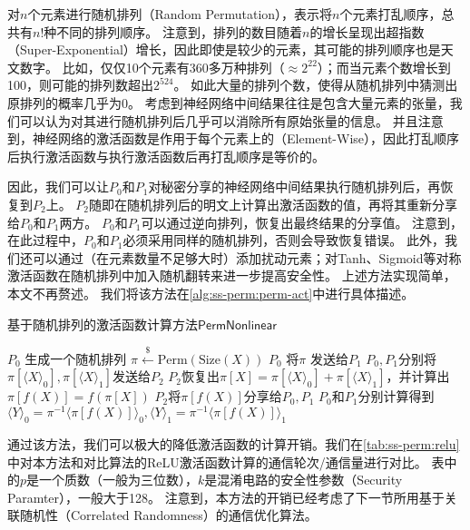 对$n$个元素进行随机排列（Random Permutation），表示将$n$个元素打乱顺序，总共有$n!$种不同的排列顺序。
%
注意到，排列的数目随着$n$的增长呈现出超指数（Super-Exponential）增长，因此即使是较少的元素，其可能的排列顺序也是天文数字。
%
比如，仅仅10个元素有360多万种排列（$\approx 2^{22}$）；而当元素个数增长到100，则可能的排列数超出$2^{524}$。
%
如此大量的排列个数，使得从随机排列中猜测出原排列的概率几乎为0。
%
考虑到神经网络中间结果往往是包含大量元素的张量，我们可以认为对其进行随机排列后几乎可以消除所有原始张量的信息。
%
并且注意到，神经网络的激活函数是作用于每个元素上的（Element-Wise），因此打乱顺序后执行激活函数与执行激活函数后再打乱顺序是等价的。

因此，我们可以让$P_0$和$P_1$对秘密分享的神经网络中间结果执行随机排列后，再恢复到$P_2$上。
%
$P_2$随即在随机排列后的明文上计算出激活函数的值，再将其重新分享给$P_0$和$P_1$两方。
%
$P_0$和$P_1$可以通过逆向排列，恢复出最终结果的分享值。
%
注意到，在此过程中，$P_0$和$P_1$必须采用同样的随机排列，否则会导致恢复错误。
%
此外，我们还可以通过（在元素数量不足够大时）添加扰动元素；对Tanh、Sigmoid等对称激活函数在随机排列中加入随机翻转来进一步提高安全性。
上述方法实现简单，本文不再赘述。
%
我们将该方法在\autoref{alg:ss-perm:perm-act}中进行具体描述。


\begin{algorithm}[h!]
    \caption{基于随机排列的激活函数计算方法$\mathsf{PermNonlinear}$}
    \label{alg:ss-perm:perm-act}
        \begin{algorithmic}[1]
        \State $P_0$ 生成一个随机排列 $\pi \stackrel{\$}{\gets} \text{Perm}(\text{Size}(X))$
        \State $P_0$ 将$\pi$ 发送给$P_1$
        \State $P_0, P_1$分别将$\pi[\langle X \rangle_0], \pi[\langle X \rangle_1]$发送给$P_2$
        \State $P_2$恢复出$\pi[X] = \pi[\langle X \rangle_0] + \pi[\langle X \rangle_1]$，并计算出$\pi[f(X)] = f(\pi[X])$
        \State $P_2$将$\pi[f(X)]$分享给$P_0, P_1$
        \State $P_0$和$P_1$分别计算得到$\langle Y \rangle_0 = \pi^{-1} \langle \pi[f(X)] \rangle_0, \langle Y \rangle_1 = \pi^{-1} \langle \pi[f(X)] \rangle_1$
    \end{algorithmic}
\end{algorithm}


通过该方法，我们可以极大的降低激活函数的计算开销。我们在\autoref{tab:ss-perm:relu}中对本方法和对比算法的ReLU激活函数计算的通信轮次/通信量进行对比。
%
表中的$p$是一个质数（一般为三位数），$k$是混淆电路的安全性参数（Security Paramter），一般大于128。
%
注意到，本方法的开销已经考虑了下一节所用基于关联随机性（Correlated Randomness）的通信优化算法。

